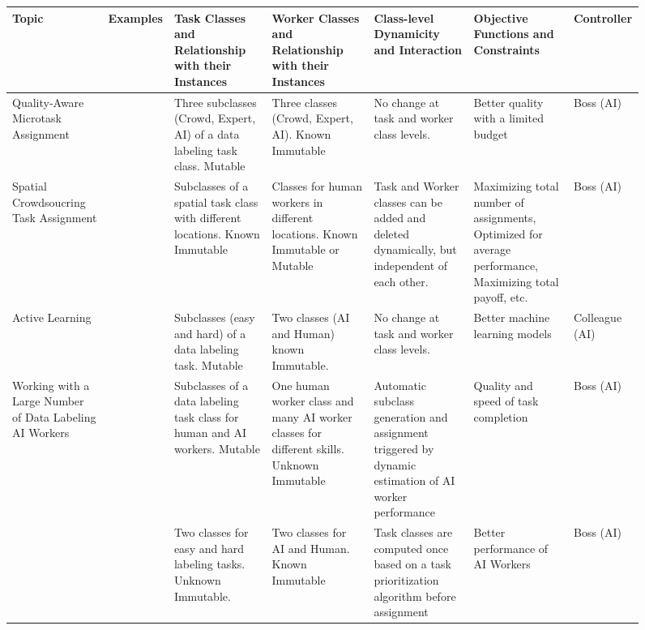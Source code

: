 \begin{figure}
   \scriptsize
    \centering
\begin{tabular}{|p{15mm}|p{10mm}|p{24mm}|p{24mm}|p{35mm}|p{24mm}|p{13mm}|}
\hline
Topic&Examples&Task Classes and Relationship with their Instances&Worker Classes and Relationship with their Instances &Class-level Dynamicity and Interaction&Objective Functions and Constraints&Controller\\
\hline
\hline
Quality-Aware Microtask Assignment & \cite{NWL15}& Three subclasses (Crowd, Expert, AI) of a data labeling task class. Mutable %
&Three classes (Crowd, Expert, AI). Known Immutable %
& No change at task and worker class levels.
& Better quality with a limited budget&Boss (AI)
\\
\hline
Spatial Crowdsoucring Task Assignment    &\cite{TZZ+20} &Subclasses of a spatial task class  with different locations. Known Immutable& Classes for human workers in different locations. Known Immutable or Mutable& Task and Worker classes  can be added and deleted dynamically, but independent of each other.
& Maximizing total number of assignments, Optimized for average performance, Maximizing total payoff, etc. &Boss (AI)\\
\hline
Active Learning   &\cite{YRF+11,RPR14,ZC15,HHM+15} &Subclasses (easy and hard) of a data labeling task. 
Mutable&Two classes (AI and Human) known Immutable.
&
No change at task and worker class levels.
&Better machine learning models& Colleague (AI) \\
\hline
Working with a Large Number of Data Labeling AI Workers& \cite{KWM20} &Subclasses of a data labeling task class for human and AI workers. Mutable %
& One human worker class and many AI worker classes for different skills. Unknown Immutable&  Automatic subclass generation and assignment triggered by dynamic estimation of AI worker performance&Quality and speed of task completion&Boss (AI)\\
\cline{2-7}
& \cite{KWM20b} &Two classes for easy and hard labeling tasks. Unknown Immutable. &Two classes for AI and Human. Known Immutable &Task classes are computed once based on a task prioritization algorithm before assignment&Better performance of AI Workers&Boss (AI)\\

\end{tabular}
\end{figure}
